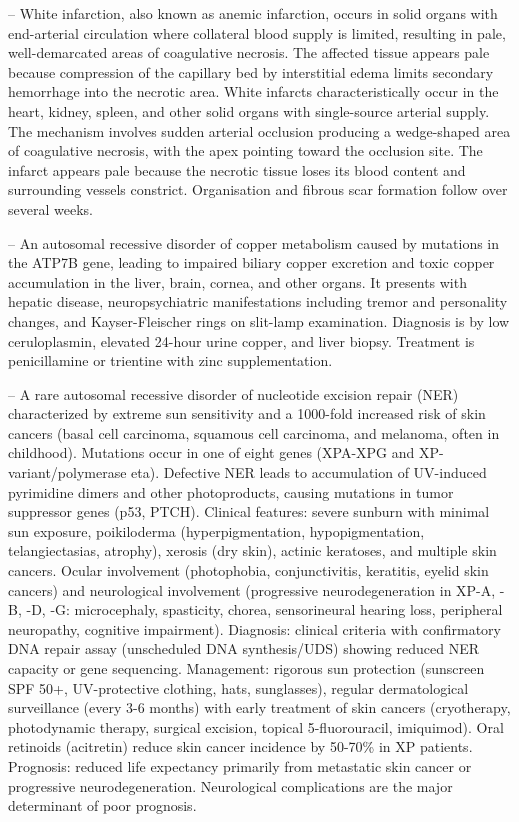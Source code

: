 -- White infarction, also known as anemic infarction, occurs in solid organs with end-arterial circulation where collateral blood supply is limited, resulting in pale, well-demarcated areas of coagulative necrosis. The affected tissue appears pale because compression of the capillary bed by interstitial edema limits secondary hemorrhage into the necrotic area. White infarcts characteristically occur in the heart, kidney, spleen, and other solid organs with single-source arterial supply. The mechanism involves sudden arterial occlusion producing a wedge-shaped area of coagulative necrosis, with the apex pointing toward the occlusion site. The infarct appears pale because the necrotic tissue loses its blood content and surrounding vessels constrict. Organisation and fibrous scar formation follow over several weeks.

-- An autosomal recessive disorder of copper metabolism caused by mutations in the ATP7B gene, leading to impaired biliary copper excretion and toxic copper accumulation in the liver, brain, cornea, and other organs. It presents with hepatic disease, neuropsychiatric manifestations including tremor and personality changes, and Kayser-Fleischer rings on slit-lamp examination. Diagnosis is by low ceruloplasmin, elevated 24-hour urine copper, and liver biopsy. Treatment is penicillamine or trientine with zinc supplementation.

-- A rare autosomal recessive disorder of nucleotide excision repair (NER) characterized by extreme sun sensitivity and a 1000-fold increased risk of skin cancers (basal cell carcinoma, squamous cell carcinoma, and melanoma, often in childhood). Mutations occur in one of eight genes (XPA-XPG and XP-variant/polymerase eta). Defective NER leads to accumulation of UV-induced pyrimidine dimers and other photoproducts, causing mutations in tumor suppressor genes (p53, PTCH). Clinical features: severe sunburn with minimal sun exposure, poikiloderma (hyperpigmentation, hypopigmentation, telangiectasias, atrophy), xerosis (dry skin), actinic keratoses, and multiple skin cancers. Ocular involvement (photophobia, conjunctivitis, keratitis, eyelid skin cancers) and neurological involvement (progressive neurodegeneration in XP-A, -B, -D, -G: microcephaly, spasticity, chorea, sensorineural hearing loss, peripheral neuropathy, cognitive impairment). Diagnosis: clinical criteria with confirmatory DNA repair assay (unscheduled DNA synthesis/UDS) showing reduced NER capacity or gene sequencing. Management: rigorous sun protection (sunscreen SPF 50+, UV-protective clothing, hats, sunglasses), regular dermatological surveillance (every 3-6 months) with early treatment of skin cancers (cryotherapy, photodynamic therapy, surgical excision, topical 5-fluorouracil, imiquimod). Oral retinoids (acitretin) reduce skin cancer incidence by 50-70\% in XP patients. Prognosis: reduced life expectancy primarily from metastatic skin cancer or progressive neurodegeneration. Neurological complications are the major determinant of poor prognosis.


